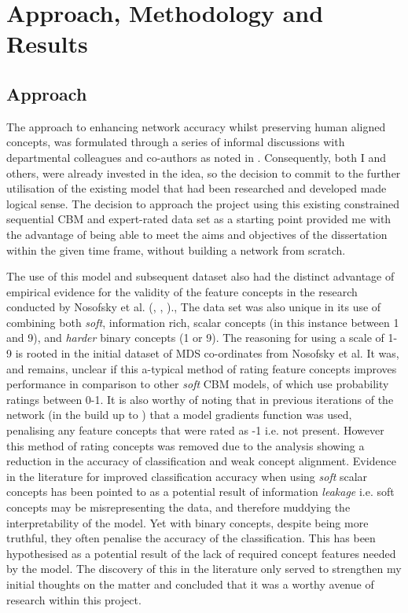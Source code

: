 \chapter{Approach, Methodology and Results}
\section{Approach}

The approach to enhancing network accuracy whilst preserving human aligned concepts, was formulated through a series of informal discussions with departmental colleagues and co-authors as noted in \cite{grangeXAISelfexplanatoryAI2022}. Consequently, both I and others, were already invested in the idea, so the decision to commit to the further utilisation of the existing model that had been researched and developed made logical sense. The decision to approach the project using this existing constrained sequential CBM and expert-rated data set \cite{grangeXAISelfexplanatoryAI2022} as a starting point provided me with the advantage of being able to meet the aims and objectives of the dissertation within the given time frame, without building a network from scratch.

The use of this model and subsequent dataset also had the distinct advantage of empirical evidence for the validity of the feature concepts in the research conducted by Nosofsky et al. (\cite{nosofskyDevelopmentFeaturespaceRepresentation2018}, \cite{miyatsuFeatureHighlightingEnhances2019}, \cite{sandersTrainingDeepNetworks2020})., The data set was also unique in its use of combining both \emph{soft}, information rich, scalar concepts (in this instance between 1 and 9), and \emph{harder} binary concepts (1 or 9). The reasoning for using a scale of 1-9 is rooted in the initial dataset of MDS co-ordinates from Nosofsky et al. It was, and remains, unclear if this a-typical method of rating feature concepts improves performance in comparison to other \emph{soft} CBM models, of which use probability ratings between 0-1. It is also worthy of noting that in previous iterations of the network (in the build up to \cite{grangeXAISelfexplanatoryAI2022})  that a model gradients function was used, penalising any feature concepts that were rated as -1 i.e.  not present. However this method of rating concepts was removed due to the analysis showing a reduction in the accuracy of classification and weak concept alignment. Evidence in the literature for improved classification accuracy when using \emph{soft} scalar concepts has been pointed to as a potential result of information \emph{leakage} \cite{havasiAddressingLeakageConcept2022a} i.e. soft concepts may be misrepresenting the data, and therefore muddying the interpretability of the model. Yet with binary concepts, despite being more truthful, they often penalise the accuracy of the classification. This has been hypothesised as a potential result of the lack of required concept features needed by the model. The discovery of this in the literature only served to strengthen my initial thoughts on the matter and concluded that it was a worthy avenue of research within this project. 

